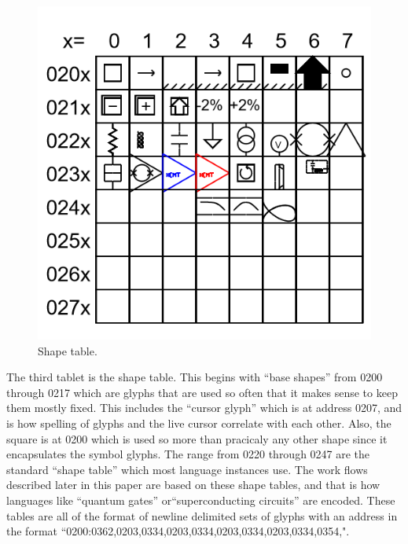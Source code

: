 \documentclass[11pt]{article}
\begin{document}
\begin{figure}

\includegraphics[width=\linewidth]{figures/figure5_shapetable.png}

\caption{Shape table.}
\end{figure}

    The third tablet is the shape table.   This begins with ``base shapes'' from 0200 through 0217 which are glyphs that are used so often that it makes sense to keep them mostly fixed.  This includes the ``cursor glyph'' which is at address 0207, and is how spelling of glyphs and the live cursor correlate with each other.  Also, the square is at 0200 which is used so more than pracicaly any other shape since it encapsulates the symbol glyphs.  The range from 0220 through 0247 are the standard ``shape table'' which most language instances use.  The work flows described later in this paper are based on these shape tables, and that is how languages like ``quantum gates'' or``superconducting circuits'' are encoded.  These tables are all of the format of newline delimited sets of glyphs with an address in the format ``0200:0362,0203,0334,0203,0334,0203,0334,0203,0334,0354,".  
\end{document}
